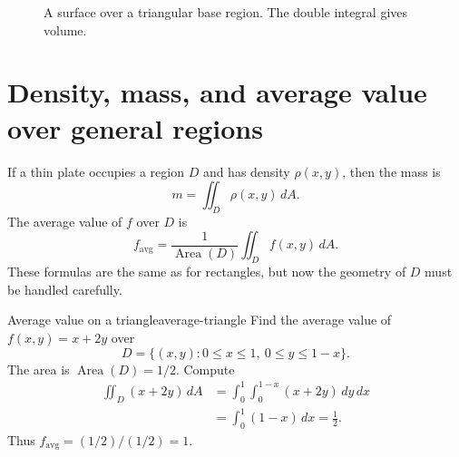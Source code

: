 \documentclass[11pt]{article}
\newcommand{\Area}{\operatorname{Area}}
\newcommand{\avg}{\operatorname{avg}}
\begin{document}
\begin{figure}[H]
\centering
{}
\caption{A surface over a triangular base region. The double integral gives volume.}
\end{figure}

\section{Density, mass, and average value over general regions}

If a thin plate occupies a region $D$ and has density $\rho(x,y)$, then the mass is
\[
m=\iint_D \rho(x,y)\,dA.
\]
The average value of $f$ over $D$ is
\[
f_{\avg}=\frac{1}{\Area(D)}\iint_D f(x,y)\,dA.
\]
These formulas are the same as for rectangles, but now the geometry of $D$ must be handled carefully.

\begin{examplebox}{Average value on a triangle}{average-triangle}
Find the average value of $f(x,y)=x+2y$ over
\[
D=\{(x,y):0\le x\le 1,\ 0\le y\le 1-x\}.
\]
The area is $\Area(D)=1/2$. Compute
\[
\begin{aligned}
\iint_D(x+2y)\,dA
&=\int_0^1\int_0^{1-x}(x+2y)\,dy\,dx \\
&=\int_0^1(1-x)\,dx=\frac12.
\end{aligned}
\]
Thus $f_{\avg}=(1/2)/(1/2)=1$.
\end{examplebox}
\end{document}
